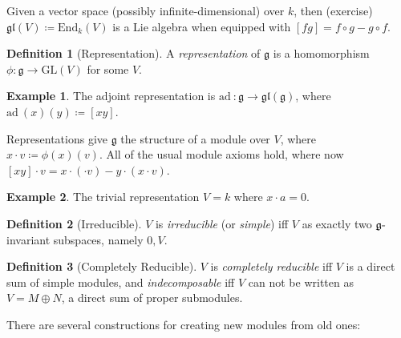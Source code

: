 \documentclass[11pt]{scrartcl}
\theoremstyle{definition}
\theoremstyle{theorem}
\theoremstyle{proof}
\theoremstyle{definition}
\newtheorem{definition}{Definition}[theorem]
\theoremstyle{break}
\newtheorem{example}{Example}[section]
\theoremstyle{problem}
\providecommand{\tightlist}{%
  \setlength{\itemsep}{0pt}\setlength{\parskip}{0pt}}
\newcommand{\gl}[0]{\mathrm{GL}}
\newcommand{\ad}[0]{\mathrm{ad}~}
\newcommand{\dash}[0]{{\hbox{-}}}
\newcommand{\definedas}[0]{\coloneqq}
\newcommand{\liegl}[0]{{\mathfrak{gl}}}
\newcommand{\lieg}[0]{{\mathfrak{g}}}
\renewcommand{\to}[0]{\longrightarrow}
\begin{document}
\begin{description}
\tightlist
\item[Exercise]
Given a vector space (possibly infinite-dimensional) over \(k\), then
(exercise) \(\liegl(V) \definedas \mathrm{End}_k(V)\) is a Lie algebra
when equipped with \([f g] = f\circ g - g\circ f\).
\end{description}

\begin{definition}[Representation]

A \emph{representation} of \(\lieg\) is a homomorphism
\(\phi: \lieg \to \gl(V)\) for some \(V\).\end{definition}

\begin{example}

The adjoint representation is \(\ad: \lieg \to \liegl(\lieg)\), where
\(\ad(x)(y) \definedas [x y]\).\end{example}

Representations give \(\lieg\) the structure of a module over \(V\),
where \(x\cdot v \definedas \phi(x)(v)\). All of the usual module axioms
hold, where now \([x y] \cdot v = x\cdot(\cdot v) - y\cdot(x\cdot v)\).

\begin{example}

The trivial representation \(V = k\) where
\(x\cdot a = 0\).\end{example}

\begin{definition}[Irreducible]

\(V\) is \emph{irreducible} (or \emph{simple}) iff \(V\) as exactly two
\(\lieg\dash\)invariant subspaces, namely \(0, V\).\end{definition}

\begin{definition}[Completely Reducible]

\(V\) is \emph{completely reducible} iff \(V\) is a direct sum of simple
modules, and \emph{indecomposable} iff \(V\) can not be written as
\(V = M \oplus N\), a direct sum of proper submodules.\end{definition}

There are several constructions for creating new modules from old ones:
\end{document}
